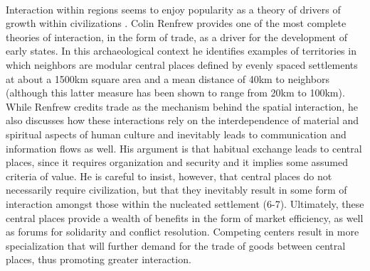 \documentclass[12pt,a4paper]{thesis}
\begin{document}
\paragraph{}
Interaction within regions seems to enjoy popularity as a theory of drivers of growth within civilizations \citetext{\citealp[226]{Kow08}; \citealp[380]{Bin83}}. Colin Renfrew \citeyearpar{Ren75} provides one of the most complete theories of interaction, in the form of trade, as a driver for the development of early states.  In this archaeological context he identifies examples of territories in which neighbors are modular central places defined  by evenly spaced settlements at about a 1500km square area and a mean distance of 40km to neighbors (although this latter measure has been shown to range from 20km to 100km). While Renfrew credits trade as the mechanism behind the spatial interaction, he also discusses how these interactions rely on the interdependence of material and spiritual aspects of human culture and inevitably leads to communication and information flows as well. His argument is that habitual exchange leads to central places, since it requires organization and security and it implies some assumed criteria of value. He is careful to insist, however, that central places do not necessarily require civilization, but that they inevitably result in some form of interaction amongst those within the nucleated settlement (6-7). Ultimately, these central places provide a wealth of benefits in the form of market efficiency, as well as forums for solidarity and conflict resolution.  Competing centers result in more specialization that will further demand for the trade of goods between central places, thus promoting greater interaction.
\end{document}
